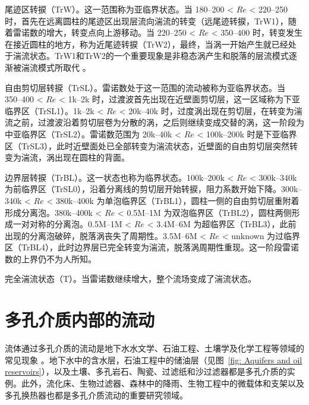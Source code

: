 尾迹区转捩（TrW）。这一范围称为亚临界状态。当 180--200 < $Re$ < 220--250 时，首先在远离圆柱的尾迹区出现层流向湍流的转变（远尾迹转捩，TrW1），随着雷诺数的增大，转变点向上游移动。当 220--250 < $Re$ < 350--400 时，转变发生在接近圆柱的地方，称为近尾迹转捩（TrW2），最终，当涡一开始产生就已经处于湍流状态。TrW1和TrW2的一个重要现象是非稳态涡产生和脱落的层流模式逐渐被湍流模式所取代 \cite{zdravkovich1997flow}。

自由剪切层转捩（TrSL）。雷诺数处于这一范围的流动被称为亚临界状态。当 350--400 < $Re$ < 1k--2k 时，过渡波首先出现在近壁面剪切层，这一区域称为下亚临界区（TrSL1）。1k--2k < $Re$ < 20k--40k 时，过度涡出现在剪切层，在转变为湍流之前，过渡波沿着剪切层卷为分散的涡，之后则继续变成交替的涡，这一阶段为中亚临界区（TrSL2）。雷诺数范围为 20k--40k < $Re$ < 100k--200k 时是下亚临界区（TrSL3），此时近壁面处已全部转变为湍流状态，近壁面的自由剪切层突然转变为湍流，涡出现在圆柱的背面。

边界层转捩（TrBL）。这一状态也称为临界状态。100k--200k < $Re$ < 300k--340k 为前临界区（TrSL0），沿着分离线的剪切层开始转捩，阻力系数开始下降。300k--340k < $Re$ < 380k--400k 为单泡临界区（TrBL1），圆柱一侧的自由剪切层重附着形成分离泡。380k--400k < $Re$ < 0.5M--1M 为双泡临界区（TrBL2），圆柱两侧形成一对对称的分离泡。0.5M--1M < $Re$ < 3.4M--6M 为超临界区（TrBL3），此前出现的分离泡破碎，脱落涡丧失了周期性。3.5M--6M < $Re$ < unknown 为过临界区（TrBL4），此时边界层已完全转变为湍流，脱落涡周期性重现。这一阶段雷诺数的上界仍不为人所知。

完全湍流状态（T）。当雷诺数继续增大，整个流场变成了湍流状态。

\section{多孔介质内部的流动}

流体通过多孔介质的流动是地下水水文学、石油工程、土壤学及化学工程等领域的常见现象 \cite{Bear2013}。地下水中的含水层，石油工程中的储油层（见图~\ref{fig: Aquifers and oil reservoirs}），以及土壤、多孔岩石、陶瓷、过滤纸和沙过滤器都是多孔介质的实例。此外，流化床、生物过滤器、森林中的降雨、生物工程中的微载体和支架以及多孔换热器也都是多孔介质流动的重要研究领域。


